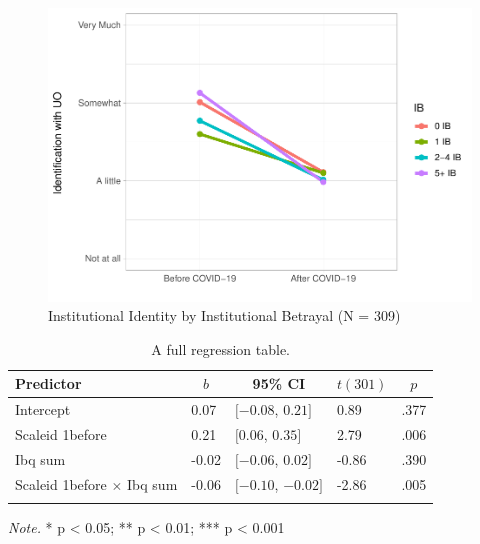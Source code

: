 \documentclass[
  english,
  man,draftall]{apa6}
\begin{document}
\begin{figure}[H]

{\centering \includegraphics[width=\textwidth]{papaja_doc_files/figure-latex/figure3-1} 

}

\caption{Institutional Identity by Institutional Betrayal (N = 309) 
}\label{fig:figure3}
\end{figure}

\begin{table}[tbp]

\begin{center}
\begin{threeparttable}

\caption{\label{tab:table3}A full regression table.}

\begin{tabular}{lllll}
\toprule
Predictor & \multicolumn{1}{c}{$b$} & \multicolumn{1}{c}{95\% CI} & \multicolumn{1}{c}{$t(301)$} & \multicolumn{1}{c}{$p$}\\
\midrule
Intercept & 0.07 & $[-0.08$, $0.21]$ & 0.89 & .377\\
Scaleid 1before & 0.21 & $[0.06$, $0.35]$ & 2.79 & .006\\
Ibq sum & -0.02 & $[-0.06$, $0.02]$ & -0.86 & .390\\
Scaleid 1before $\times$ Ibq sum & -0.06 & $[-0.10$, $-0.02]$ & -2.86 & .005\\
\bottomrule
\addlinespace
\end{tabular}

\begin{tablenotes}[para]
\normalsize{\textit{Note.} * p < 0.05; ** p < 0.01; *** p < 0.001}
\end{tablenotes}

\end{threeparttable}
\end{center}

\end{table}
\end{document}
